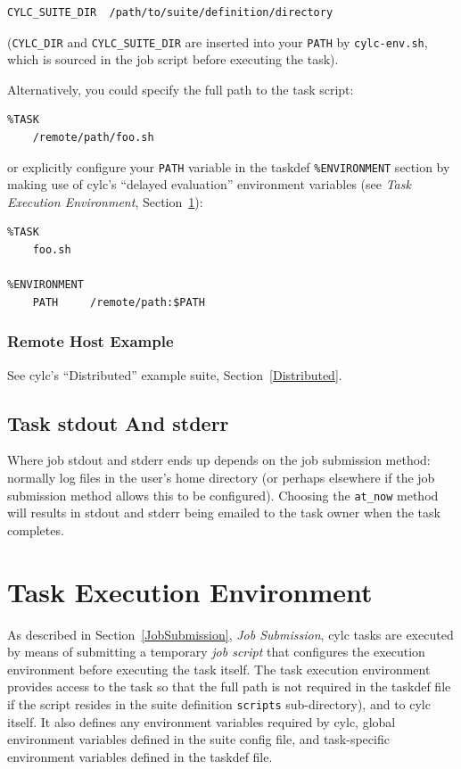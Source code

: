 \documentclass[11pt,a4paper]{article}
\begin{document}
\begin{lstlisting}
CYLC_SUITE_DIR  /path/to/suite/definition/directory
\end{lstlisting}

(\lstinline=CYLC_DIR=  and \lstinline=CYLC_SUITE_DIR= are inserted
into your \lstinline=PATH= by \lstinline=cylc-env.sh=, which is sourced
in the job script before executing the task).

Alternatively, you could specify the full path to the task script:

\begin{lstlisting}
%TASK
    /remote/path/foo.sh
\end{lstlisting}

or explicitly configure your \lstinline=PATH= variable in the taskdef
\lstinline=%ENVIRONMENT= section by making use of cylc's ``delayed
evaluation'' environment variables (see {\em Task Execution
Environment}, Section~\ref{TaskExecutionEnvironment}):

\begin{lstlisting}
%TASK
    foo.sh

%ENVIRONMENT
    PATH     /remote/path:$PATH
\end{lstlisting}

\subsubsection{Remote Host Example}

See cylc's ``Distributed'' example suite, Section~\ref{Distributed}.


\subsection{Task stdout And stderr}
\label{TaskstdoutAndstderr}

Where job stdout and stderr ends up depends on the job submission
method: normally log files in the user's home directory (or perhaps
elsewhere if the job submission method allows this to be configured).
Choosing the \lstinline=at_now= method will results in stdout and
stderr being emailed to the task owner when the task completes.

\pagebreak
\section{Task Execution Environment}
\label{TaskExecutionEnvironment}

As described in Section~\ref{JobSubmission}, {\em Job Submission}, cylc
tasks are executed by means of submitting a temporary {\em job script}
that configures the execution environment before
executing the task itself. The task execution environment provides
access to the task so that the full path is not required in the
taskdef file if the script resides in the suite definition
\lstinline=scripts= sub-directory), and to cylc itself. It also
defines any environment variables required by cylc, global
environment variables defined in the suite config file, and 
task-specific environment variables defined in the taskdef file.
\end{document}
